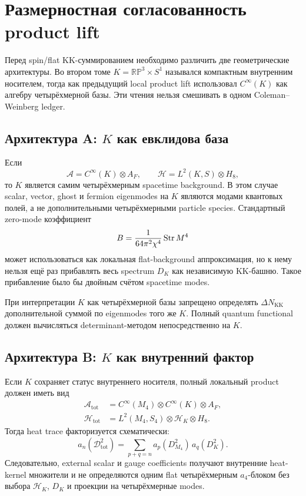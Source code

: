 \chapter{Размерностная согласованность product lift}

Перед spin/flat KK-суммированием необходимо различить две геометрические
архитектуры. Во втором томе \(K=\mathbb{RP}^3\times S^1\) назывался
компактным внутренним носителем, тогда как предыдущий local product lift
использовал \(C^\infty(K)\) как алгебру четырёхмерной базы. Эти чтения
нельзя смешивать в одном Coleman--Weinberg ledger.

\section{Архитектура A: \(K\) как евклидова база}

Если
\begin{equation}
 \mathcal A=C^\infty(K)\otimes A_F,
 \qquad
 \mathcal H=L^2(K,S)\otimes H_8,
\end{equation}
то \(K\) является самим четырёхмерным spacetime background. В этом случае
scalar, vector, ghost и fermion eigenmodes на \(K\) являются модами
квантовых полей, а не дополнительными четырёхмерными particle species.
Стандартный zero-mode коэффициент
\begin{equation}
 B=\frac1{64\pi^2\chi^4}\operatorname{Str} M^4
\end{equation}
может использоваться как локальная flat-background аппроксимация, но к
нему нельзя ещё раз прибавлять весь spectrum \(D_K\) как независимую
KK-башню. Такое прибавление было бы двойным счётом spacetime modes.

\begin{nogocriterion}
При интерпретации \(K\) как четырёхмерной базы запрещено определять
\(\Delta N_{\mathrm{KK}}\) дополнительной суммой по eigenmodes того же
\(K\). Полный quantum functional должен вычисляться determinant-методом
непосредственно на \(K\).
\end{nogocriterion}

\section{Архитектура B: \(K\) как внутренний фактор}

Если \(K\) сохраняет статус внутреннего носителя, полный локальный product
должен иметь вид
\begin{align}
 \mathcal A_{\mathrm{tot}}
 &=C^\infty(M_4)\otimes C^\infty(K)\otimes A_F,
 \\
 \mathcal H_{\mathrm{tot}}
 &=L^2(M_4,S_4)\otimes\mathcal H_K\otimes H_8.
\end{align}
Тогда heat trace факторизуется схематически:
\begin{equation}
 a_n(\mathcal D_{\mathrm{tot}}^2)
 =\sum_{p+q=n}
 a_p(D_{M_4}^2)\,a_q(D_K^2).
\end{equation}
Следовательно, external scalar и gauge coefficients получают внутренние
heat-kernel множители и не определяются одним flat четырёхмерным
\(a_4\)-блоком без выбора \(\mathcal H_K\), \(D_K\) и проекции на
четырёхмерные modes.

